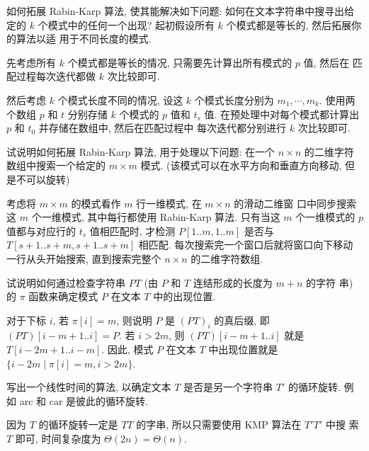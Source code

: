 \documentclass[boxes]{homework}
\begin{document}
\begin{problem}
如何拓展 Rabin-Karp 算法, 使其能解决如下问题: 如何在文本字符串中搜寻出给定的 $k$
个模式中的任何一个出现? 起初假设所有 $k$ 个模式都是等长的, 然后拓展你的算法以适
用于不同长度的模式.
\end{problem}
\begin{solution}
    先考虑所有 $k$ 个模式都是等长的情况, 只需要先计算出所有模式的 $p$ 值, 然后在
    匹配过程每次迭代都做 $k$ 次比较即可.

    然后考虑 $k$ 个模式长度不同的情况, 设这 $k$ 个模式长度分别为 $m_{1}, \cdots,
        m_{k}$. 使用两个数组 $p$ 和 $t$ 分别存储 $k$ 个模式的 $p$ 值和 $t_{s}$ 值.
    在预处理中对每个模式都计算出 $p$ 和 $t_{0}$ 并存储在数组中, 然后在匹配过程中
    每次迭代都分别进行 $k$ 次比较即可.
\end{solution}

\begin{problem}
试说明如何拓展 Rabin-Karp 算法, 用于处理以下问题: 在一个 $n \times n$ 的二维字符
数组中搜索一个给定的 $m \times m$ 模式. (该模式可以在水平方向和垂直方向移动, 但
是不可以旋转)
\end{problem}
\begin{solution}
    考虑将 $m \times m$ 的模式看作 $m$ 行一维模式, 在 $m \times n$ 的滑动二维窗
    口中同步搜索这 $m$ 个一维模式, 其中每行都使用 Rabin-Karp 算法. 只有当这 $m$
    个一维模式的 $p$ 值都与对应行的 $t_{s}$ 值相匹配时, 才检测 $P[1..m, 1..m]$
    是否与 $T[s+1..s+m, s+1..s+m]$ 相匹配. 每次搜索完一个窗口后就将窗口向下移动
    一行从头开始搜索, 直到搜索完整个 $n \times n$ 的二维字符数组.
\end{solution}

\begin{problem}
试说明如何通过检查字符串 $PT$ (由 $P$ 和 $T$ 连结形成的长度为 $m + n$ 的字符
串) 的 $\pi$ 函数来确定模式 $P$ 在文本 $T$ 中的出现位置.
\end{problem}
\begin{solution}
    对于下标 $i$, 若 $\pi[i] = m$, 则说明 $P$ 是 ${(PT)}_{i}$ 的真后缀, 即
    $(PT)[i-m+1..i] = P$. 若 $i>2m$, 则 $(PT)[i-m+1..i]$ 就是 $T[i-2m+1..i-m]$.
    因此, 模式 $P$ 在文本 $T$ 中出现位置就是 $\{i - 2m \mid \pi[i] = m, i > 2m\}$.
\end{solution}

\begin{problem}
写出一个线性时间的算法, 以确定文本 $T$ 是否是另一个字符串 $T'$ 的循环旋转. 例如
arc 和 car 是彼此的循环旋转.
\end{problem}
\begin{solution}
    因为 $T$ 的循环旋转一定是 $TT$ 的字串, 所以只需要使用 KMP 算法在 $T'T'$ 中搜
    索 $T$ 即可, 时间复杂度为 $\Theta(2n) = \Theta(n)$.
\end{solution}
\end{document}
